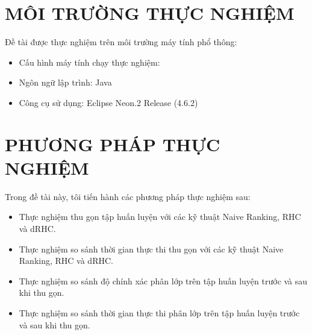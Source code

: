 \documentclass[13pt,oneside]{scrbook}
\begin{document}
\section{MÔI TRƯỜNG THỰC NGHIỆM}
Đề tài được thực nghiệm trên môi trường máy tính phổ thông:
\begin{itemize}
\item Cấu hình máy tính chạy thực nghiệm:
\item Ngôn ngữ lập trình: Java
\item Công cụ sử dụng: Eclipse Neon.2 Release (4.6.2) 
\end{itemize}
\section{PHƯƠNG PHÁP THỰC NGHIỆM}
Trong đề tài này, tôi tiến hành các phương pháp thực nghiệm sau:
\begin{itemize}
\item Thực nghiệm thu gọn tập huấn luyện với các kỹ thuật Naive Ranking, RHC và dRHC.
\item Thực nghiệm so sánh thời gian thực thi thu gọn với các kỹ thuật Naive Ranking, RHC và dRHC.
\item Thực nghiệm so sánh độ chính xác phân lớp trên tập huấn luyện trước và sau khi thu gọn.
\item Thực nghiệm so sánh thời gian thực thi phân lớp trên tập huấn luyện trước và sau khi thu gọn.
\end{itemize}
\end{document}

